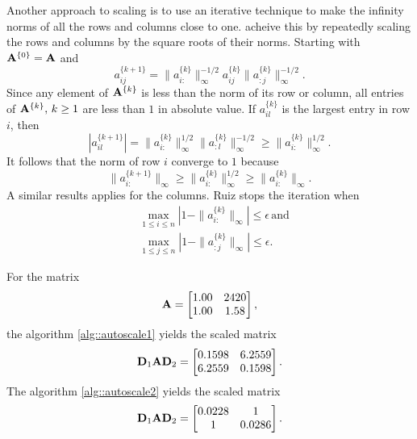 \begin{alg}
    \label{alg::autoscale2}
    Another approach to scaling is to use an iterative 
    technique to make the infinity norms of all the rows and 
    columns close to one. \cite{Ruiz2014} acheive this by 
    repeatedly scaling the rows and columns by the square roots 
    of their norms. Starting with ${\mathbf{A}}^{\{0\}}={\mathbf{A}}$ and 
    $$
        a_{ij}^{\{k+1\}}=\|a_{i:}^{\{k\}}\|_\infty^{-1/2}
        a_{ij}^{\{k\}}\|a_{:j}^{\{k\}}\|_\infty^{-1/2}.
    $$ 
    Since any element of ${\mathbf{A}}^{\{k\}}$ is less than the norm of 
    its row or column, all entries of ${\mathbf{A}}^{\{k\}},\,k\geq 1$ 
    are less than $1$ in absolute value. If $a_{il}^{\{k\}}$ is 
    the largest entry in row $i$, then
    $$
        |a_{il}^{\{k+1\}}|=\|a_{i:}^{\{k\}}\|_\infty^{1/2}
        \|a_{:l}^{\{k\}}\|_\infty^{-1/2}\geq
        \|a_{i:}^{\{k\}}\|_\infty^{1/2}.
    $$ 
    It follows that the norm of row $i$ converge to $1$ because
    $$
        \|a_{i:}^{\{k+1\}}\|_\infty\geq
        \|a_{i:}^{\{k\}}\|_\infty^{1/2}\geq
        \|a_{i:}^{\{k\}}\|_\infty.
    $$ 
    A similar results applies for the columns. Ruiz stops the 
    iteration when
    \begin{align*}
        &\max_{1\leq i\leq n}\left|1-\|a_{i:}^{\{k\}}\|_\infty
        \right|\leq\epsilon \,\mathrm{and} \\
        &\max_{1\leq j\leq n}\left|1-\|a_{:j}^{\{k\}}\|_\infty
        \right|\leq\epsilon.
    \end{align*}
\end{alg}

\begin{exm}
    For the matrix
    $$
        {\mathbf{A}}=
        \begin{bmatrix}
            1.00&2420\\1.00&1.58
        \end{bmatrix},
    $$ 
    the algorithm \ref{alg::autoscale1} yields the scaled matrix
    $$
        \mathbf{D}_1{\mathbf{A}}\mathbf{D}_2=
        \begin{bmatrix}
            0.1598&6.2559\\6.2559&0.1598
        \end{bmatrix}.
    $$ 
    The algorithm \ref{alg::autoscale2} yields the scaled matrix
    $$
    \mathbf{D}_1{\mathbf{A}}\mathbf{D}_2=
    \begin{bmatrix}
        0.0228&1\\1&0.0286
    \end{bmatrix}.
    $$ 
\end{exm}

